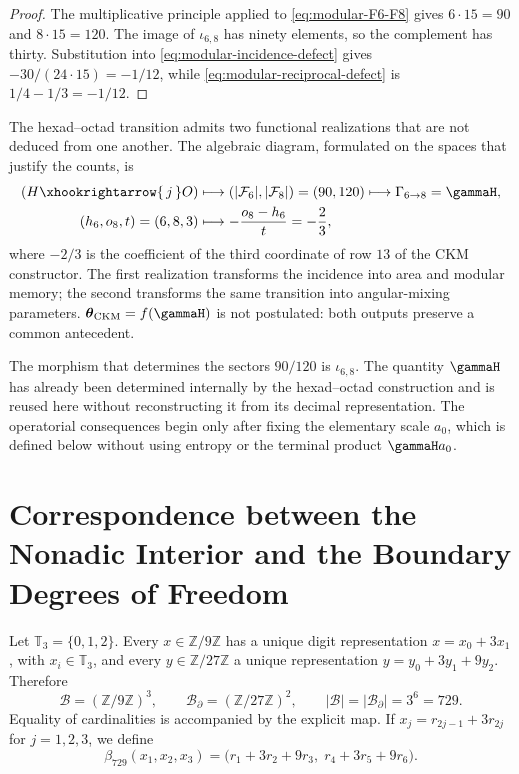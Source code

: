 \begin{proof}
The multiplicative principle applied to
\cref{eq:modular-F6-F8} gives \(6\cdot15=90\) and \(8\cdot15=120\).
The image of \(\iota_{6,8}\) has ninety elements, so the
complement has thirty. Substitution into
\cref{eq:modular-incidence-defect} gives
\(-30/(24\cdot15)=-1/12\), while
\cref{eq:modular-reciprocal-defect} is
\(1/4-1/3=-1/12\).
\end{proof}

The hexad--octad transition admits two functional realizations that
are not deduced from one another. The algebraic diagram, formulated on the spaces
that justify the counts, is
\begin{equation}
\label{eq:modular-68-two-readers}
\begin{aligned}
(H\xhookrightarrow{\,j\,}O)
&\longmapsto
\left(|\mathcal F_6|,|\mathcal F_8|\right)=(90,120)
\longmapsto\Gamma_{6\to8}=\gammaH,\\
(h_6,o_8,t)=(6,8,3)
&\longmapsto-\frac{o_8-h_6}{t}=-\frac23,
\end{aligned}
\end{equation}
where \(-2/3\) is the coefficient of the third coordinate of row \(13\) of the CKM constructor. The first realization transforms the incidence into area and modular memory; the second transforms the same transition into angular-mixing parameters. \(\boldsymbol\theta_{\rm CKM}=f(\gammaH)\) is not postulated: both outputs preserve a common antecedent.

The morphism that determines the sectors \(90/120\) is
\(\iota_{6,8}\). The quantity \(\gammaH\) has already been determined internally
by the hexad--octad construction and is reused here without reconstructing it from
its decimal representation. The
operatorial consequences begin only after fixing the elementary
scale \(a_0\), which is defined below without using entropy or the
terminal product \(\gammaH a_0\).

\section{Correspondence between the Nonadic Interior and the Boundary Degrees of Freedom}

Let \(\mathbb T_3=\{0,1,2\}\). Every \(x\in\mathbb Z/9\mathbb Z\) has
a unique digit representation
\(x=x_0+3x_1\), with \(x_i\in\mathbb T_3\), and every
\(y\in\mathbb Z/27\mathbb Z\) a unique representation
\(y=y_0+3y_1+9y_2\). Therefore
\begin{equation}
\label{eq:modular-bulk-boundary-729}
\mathcal B=(\mathbb Z/9\mathbb Z)^3,
\qquad
\mathcal B_\partial=(\mathbb Z/27\mathbb Z)^2,
\qquad
|\mathcal B|=|\mathcal B_\partial|=3^6=729.
\end{equation}
Equality of cardinalities is accompanied by the explicit
map. If \(x_j=r_{2j-1}+3r_{2j}\) for \(j=1,2,3\), we define
\begin{equation}
\label{eq:modular-beta729}
\beta_{729}(x_1,x_2,x_3)
=\bigl(r_1+3r_2+9r_3,\;r_4+3r_5+9r_6\bigr).
\end{equation}

